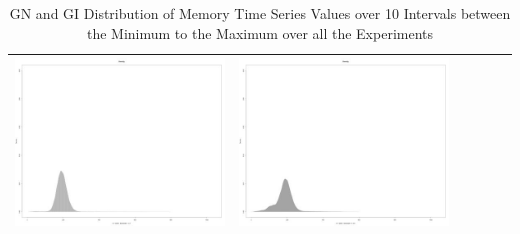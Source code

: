 \begin{table}[htbp]
{\begin{tabular}{l | ccccc}
\begin{minipage}{.15\textwidth}
     			 	\includegraphics[width=\linewidth]{images/mema-dens-graph/I14}
    				 \end{minipage}
    			   &	 \begin{minipage}{.15\textwidth}
     			 	\includegraphics[width=\linewidth]{images/mema-dens-graph/I15}
    				 \end{minipage}\\
		\hline %
	 \end{tabular}
	}
	\caption[\textsc{Analyser} Investigation Stack - Level 2 - Pattern Identification - Memory Distribution - Baselines GN and GI]{GN and GI Distribution of Memory Time Series Values over 10 Intervals between the Minimum to the Maximum over all the Experiments} 
	\label{fig:level2-memory-density-graph}
	\end{table}